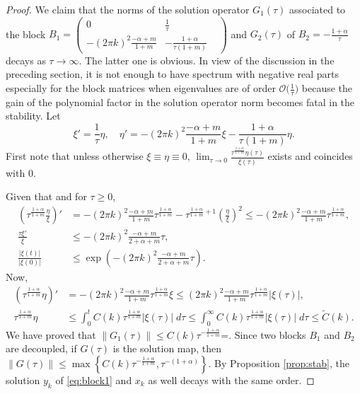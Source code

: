 \documentclass[a4paper,11pt]{article}
\def\k{(2\pi k)}
\theoremstyle{remark}
\begin{document}
\begin{proof}
We claim that the norms of the solution operator $G_1(\tau)$ associated to the block $B_1=\begin{pmatrix} 0 & \frac{1}{\tau} \\-\k^2\frac{-\alpha+m}{1+m} & -\frac{1+\alpha}{\tau(1+m)} & \end{pmatrix}$ and $G_2(\tau)$ of $B_2 = -\frac{1+\alpha}{\tau}$ decays as $\tau \rightarrow \infty.$ The latter one is obvious.
In view of the discussion in the preceding section, it is not enough to have spectrum with negative real parts especially for the block matrices when eigenvalues are of order $\mathcal{O}\big(\frac{1}{\tau}\big)$ because the gain of the polynomial factor in the solution operator norm becomes fatal in the stability.
Let $$\xi' = \frac{1}{\tau} \eta, \quad \eta' = -\k^2\frac{-\alpha+m}{1+m}\xi -\frac{1+\alpha}{\tau(1+m)}\eta.$$
First note that unless otherwise $\xi\equiv\eta\equiv 0$, $\displaystyle\lim_{\tau \rightarrow 0} \frac{\tau^{\frac{1+\alpha}{1+m}}\eta(\tau)}{\xi(\tau)}$ exists and coincides with $0$.

Given that and for $\tau\ge0$,
\begin{align*}
 \left(\tau^{\frac{1+\alpha}{1+m}}\frac{\eta}{\xi}\right)' &=  -\k^2\frac{-\alpha+m}{1+m}\tau^{\frac{1+\alpha}{1+m}}  -\tau^{\frac{1+\alpha}{1+m}+1}\left(\frac{\eta}{\xi}\right)^2 \le -\k^2\frac{-\alpha+m}{1+m}\tau^{\frac{1+\alpha}{1+m}},\\
 \frac{\tau \xi'}{\xi} &\le -\k^2\frac{-\alpha+m}{2+\alpha+m}\tau,\\
 \frac{|\xi(t)|}{|\xi(0)|} &\le \exp\left(-\k^2\frac{-\alpha+m}{2+\alpha+m}\tau\right).
\end{align*}
Now,
\begin{align*}
 \left(\tau^{\frac{1+\alpha}{1+m}} \eta\right)' &= -\k^2\frac{-\alpha+m}{1+m}\tau^{\frac{1+\alpha}{1+m}}\xi \le \k^2\frac{-\alpha+m}{1+m}\tau^{\frac{1+\alpha}{1+m}} |\xi(\tau)|,\\
 \tau^{\frac{1+\alpha}{1+m}} \eta &\le \int_0^t C(k)\tau^{\frac{1+\alpha}{1+m}} |\xi(\tau)|\; d\tau \le \int_0^\infty C(k)\tau^{\frac{1+\alpha}{1+m}} |\xi(\tau)|\; d\tau \le \tilde{C}(k).
\end{align*}
We have proved that $\|G_1(\tau)\| \le C(k)\tau^{-\frac{1+\alpha}{1+m}}$=. Since two blocks $B_1$ and $B_2$ are decoupled, if $G(\tau)$ is the solution map, then $\|G(\tau)\| \le \max\left\{C(k)\tau^{-\frac{1+\alpha}{1+m}},\tau^{-(1+\alpha)}\right\}$. By Proposition \ref{prop:stab}, the solution $y_k$ of \eqref{eq:block1} and $x_k$ as well decays with the same order.


\end{proof}
\end{document}

